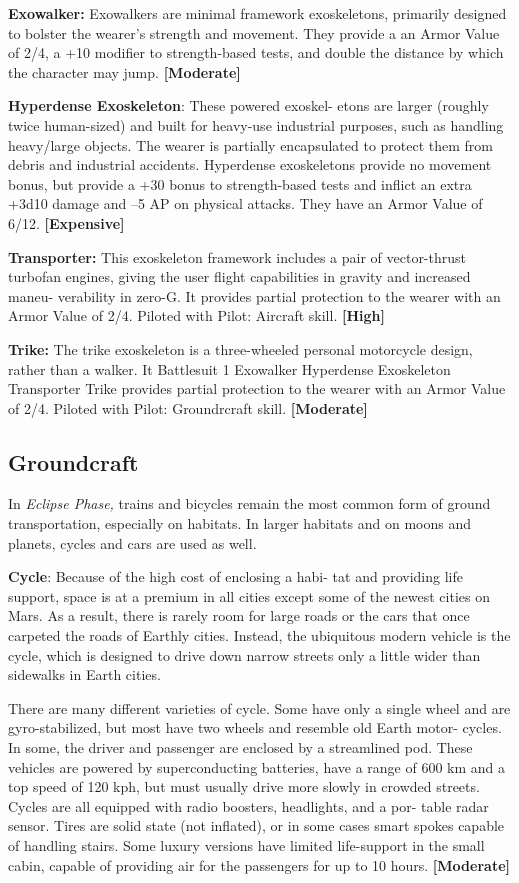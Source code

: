 \textbf{Exowalker:} Exowalkers are minimal framework 
exoskeletons, primarily designed to bolster the 
wearer's strength and movement. They provide a an 
Armor Value of 2/4, a +10 modifier to strength-based 
tests, and double the distance by which the character 
may jump. \textbf{[Moderate]}

\textbf{Hyperdense Exoskeleton}: These powered exoskel-
etons are larger (roughly twice human-sized) and built 
for heavy-use industrial purposes, such as handling 
heavy/large objects. The wearer is partially encapsulated 
to protect them from debris and industrial accidents. 
Hyperdense exoskeletons provide no movement bonus, 
but provide a +30 bonus to strength-based tests and 
inflict an extra +3d10 damage and –5 AP on physical 
attacks. They have an Armor Value of 6/12. \textbf{[Expensive]}

\textbf{Transporter:} This exoskeleton framework includes 
a pair of vector-thrust turbofan engines, giving the 
user flight capabilities in gravity and increased maneu-
verability in zero-G. It provides partial protection to 
the wearer with an Armor Value of 2/4. Piloted with 
Pilot: Aircraft skill. \textbf{[High]}

\textbf{Trike:} The trike exoskeleton is a three-wheeled 
personal motorcycle design, rather than a walker. It 
Battlesuit 1
Exowalker
Hyperdense 
Exoskeleton
Transporter
Trike
provides partial protection to the wearer with an 
Armor Value of 2/4. Piloted with Pilot: Groundrcraft 
skill. \textbf{[Moderate]}

\subsection{Groundcraft}

In \textit{Eclipse Phase,} trains and bicycles remain the most 
common form of ground transportation, especially on 
habitats. In larger habitats and on moons and planets, 
cycles and cars are used as well.

\textbf{Cycle}: Because of the high cost of enclosing a habi-
tat and providing life support, space is at a premium 
in all cities except some of the newest cities on Mars. 
As a result, there is rarely room for large roads or the 
cars that once carpeted the roads of Earthly cities. 
Instead, the ubiquitous modern vehicle is the cycle, 
which is designed to drive down narrow streets only a 
little wider than sidewalks in Earth cities.

There are many different varieties of cycle. Some 
have only a single wheel and are gyro-stabilized, but 
most have two wheels and resemble old Earth motor-
cycles. In some, the driver and passenger are enclosed 
by a streamlined pod. These vehicles are powered 
by superconducting batteries, have a range of 600 
km and a top speed of 120 kph, but must usually 
drive more slowly in crowded streets. Cycles are all 
equipped with radio boosters, headlights, and a por-
table radar sensor. Tires are solid state (not inflated), 
or in some cases smart spokes capable of handling 
stairs. Some luxury versions have limited life-support 
in the small cabin, capable of providing air for the 
passengers for up to 10 hours. \textbf{[Moderate]}

